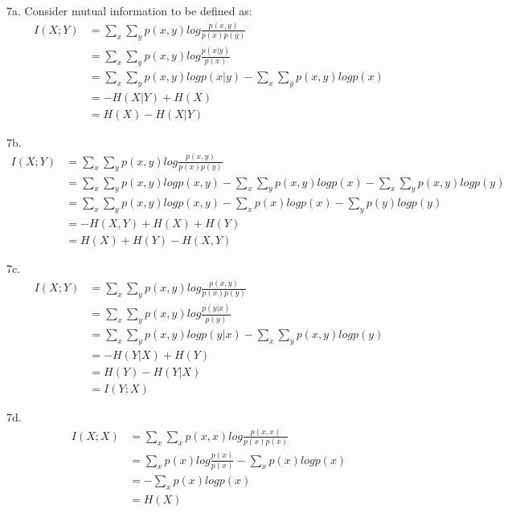 \documentclass[12pt]{article}
\begin{document}
7a. Consider mutual information to be defined as:
\begin{align} \nonumber
I(X;Y) &= \sum_x\sum_yp(x,y)log\frac{p(x,y)}{p(x)p(y)} \\ \nonumber
&= \sum_x\sum_yp(x,y)log\frac{p(x|y)}{p(x)} \\ \nonumber
&= \sum_x\sum_yp(x,y)logp(x|y) - \sum_x\sum_yp(x,y)logp(x) \\ \nonumber
&= -H(X|Y) + H(X) \\ \nonumber
&= H(X) - H(X|Y)
\end{align}

\newpage

7b. 
\begin{align} \nonumber
I(X;Y) &= \sum_x\sum_yp(x,y)log\frac{p(x,y)}{p(x)p(y)} \\ \nonumber
&= \sum_x\sum_yp(x,y)logp(x,y) - \sum_x\sum_yp(x,y)logp(x) - \sum_x\sum_yp(x,y)logp(y) \\ \nonumber
&= \sum_x\sum_yp(x,y)logp(x,y) - \sum_xp(x)logp(x) - \sum_yp(y)logp(y) \\ \nonumber
&= -H(X,Y) + H(X) + H(Y) \\ \nonumber
&= H(X) + H(Y) - H(X,Y)
\end{align}

7c.
\begin{align} \nonumber
I(X;Y) &= \sum_x\sum_yp(x,y)log\frac{p(x,y)}{p(x)p(y)} \\ \nonumber
&= \sum_x\sum_yp(x,y)log\frac{p(y|x)}{p(y)} \\ \nonumber
&= \sum_x\sum_yp(x,y)logp(y|x) - \sum_x\sum_yp(x,y)logp(y) \\ \nonumber
&= - H(Y|X) + H(Y) \\ \nonumber
&= H(Y) - H(Y|X) \\ \nonumber
&= I(Y;X)
\end{align}

7d.
\begin{align} \nonumber
I(X;X) &= \sum_x\sum_xp(x,x)log\frac{p(x,x)}{p(x)p(x)} \\ \nonumber
&= \sum_xp(x)log\frac{p(x)}{p(x)} - \sum_xp(x)logp(x)\\ \nonumber
&= -\sum_xp(x)logp(x) \\ \nonumber
&= H(X)
\end{align}

\newpage
\end{document}
